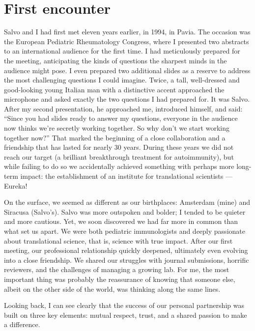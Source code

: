\documentclass[authordate, editorial]{jote-new-article}
\begin{document}
	\section{First encounter}



	Salvo and I had first met eleven years earlier, in 1994, in Pavia. The occasion was the European Pediatric Rheumatology Congress, where I presented two abstracts to an international audience for the first time. I had meticulously prepared for the meeting, anticipating the kinds of questions the sharpest minds in the audience might pose. I even prepared two additional slides as a reserve to address the most challenging questions I could imagine. Twice, a tall, well-dressed and good-looking young Italian man with a distinctive accent approached the microphone and asked exactly the two questions I had prepared for. It was Salvo. After my second presentation, he approached me, introduced himself, and said: “Since you had slides ready to answer my questions, everyone in the audience now thinks we're secretly working together. So why don't we start working together now?” That marked the beginning of a close collaboration and a friendship that has lasted for nearly 30 years. During these years we did not reach our target (a brilliant breakthrough treatment for autoimmunity), but while failing to do so we accidentally achieved something with perhaps more long-term impact: the establishment of an institute for translational scientists — Eureka!







	On the surface, we seemed as different as our birthplaces: Amsterdam (mine) and Siracusa (Salvo's). Salvo was more outspoken and bolder; I tended to be quieter and more cautious. Yet, we soon discovered we had far more in common than what set us apart. We were both pediatric immunologists and deeply passionate about translational science, that is, science with true impact. After our first meeting, our professional relationship quickly deepened, ultimately even evolving into a close friendship. We shared our struggles with journal submissions, horrific reviewers, and the challenges of managing a growing lab. For me, the most important thing was probably the reassurance of knowing that someone else, albeit on the other side of the world, was thinking along the same lines.



	Looking back, I can see clearly that the success of our personal partnership was built on three key elements: mutual respect, trust, and a shared passion to make a difference.
\end{document}
